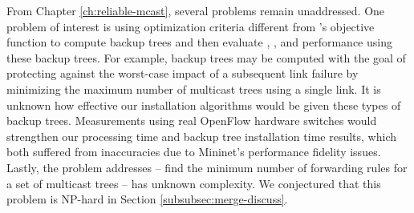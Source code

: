 From Chapter \ref{ch:reliable-mcast}, several problems remain unaddressed. One problem of interest is using optimization criteria different from \mcs's objective function 
to compute backup trees and then evaluate \pres, \posts, and \merge performance using these backup trees.  
For example, backup trees may be computed with the goal of protecting against the worst-case impact of a subsequent link failure
by minimizing the maximum number of multicast trees using a single link. %
It is unknown how effective our installation algorithms would be given these types of backup trees. %
Measurements using real OpenFlow hardware switches would strengthen our \pcnt processing time and backup tree installation time results, which both suffered from inaccuracies due to Mininet's
performance fidelity issues.  
Lastly, the problem \merge addresses -- find the minimum number of forwarding rules for a set of multicast trees -- has unknown complexity.
We conjectured that this problem is NP-hard in Section \ref{subsubsec:merge-discuss}.


